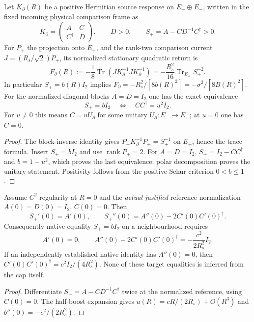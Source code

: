 \documentclass[12pt,a4paper]{article}
\begin{document}
\begin{theorem}
\label{p3e:thm:v353-positive-schur}
Let $K_\partial(R)$ be a positive Hermitian source response on
$E_+\oplus E_-$, written in the fixed incoming physical comparison
frame as
\[
 K_\partial=\begin{pmatrix}A&C\\C^\dagger&D\end{pmatrix},
 \qquad D>0,\qquad S_+=A-CD^{-1}C^\dagger>0.
\]
For $P_+$ the projection onto $E_+$, and the rank-two comparison
current $J=(R_s/\sqrt2)P_+$, its normalized stationary quadratic return is
\begin{equation}
\label{p3e:eq:v353-schur-trace}
 F_\partial(R):=-\frac18\operatorname{Tr}
      (JK_\partial^{-1}JK_\partial^{-1})
 =-\frac{R_s^2}{16}\operatorname{Tr}_{E_+}S_+^{-2}.
\end{equation}
In particular $S_+=b(R)I_2$ implies
$F_\partial=-R_s^2/[8b(R)^2]=-\sigma^2/[8B(R)^2]$.
For the normalized diagonal blocks $A=D=I_2$ one has the exact
equivalence
\begin{equation}
\label{p3e:eq:v353-mixing-characterization}
 S_+=bI_2\quad\Longleftrightarrow\quad
 CC^\dagger=u^2 I_2.
\end{equation}
For $u\ne0$ this means $C=uU_\partial$ for some unitary
$U_\partial:E_-\to E_+$; at $u=0$ one has $C=0$.
\end{theorem}
\begin{proof}
The block-inverse identity gives
$P_+K_\partial^{-1}P_+=S_+^{-1}$ on $E_+$, hence the trace formula.
Insert $S_+=bI_2$ and use $\operatorname{rank}P_+=2$.
For $A=D=I_2$, $S_+=I_2-CC^\dagger$ and $b=1-u^2$,
which proves the last equivalence; polar decomposition proves the
unitary statement.  Positivity follows from the positive Schur
criterion $0<b\le1$.
\end{proof}

\begin{proposition}
\label{p3e:prop:v353-schur-jet}
Assume $C^2$ regularity at $R=0$ and the \emph{actual justified}
reference normalization $A(0)=D(0)=I_2$, $C(0)=0$.
Then
\[
 S_+'(0)=A'(0),\qquad
 S_+''(0)=A''(0)-2C'(0)C'(0)^\dagger.
\]
Consequently native equality $S_+=bI_2$ on a neighbourhood requires
\begin{equation}
\label{p3e:eq:v353-native-jet-target}
 A'(0)=0,\qquad
 A''(0)-2C'(0)C'(0)^\dagger
 =-\frac{c^2}{2R_s^2}I_2.
\end{equation}
If an independently established native identity has $A''(0)=0$,
then $C'(0)C'(0)^\dagger=c^2I_2/(4R_s^2)$.
None of these target equalities is inferred from the cap itself.
\end{proposition}
\begin{proof}
Differentiate $S_+=A-CD^{-1}C^\dagger$ twice at the normalized
reference, using $C(0)=0$.  The half-boost expansion gives
$u(R)=cR/(2R_s)+O(R^3)$ and
$b''(0)=-c^2/(2R_s^2)$.
\end{proof}
\end{document}
